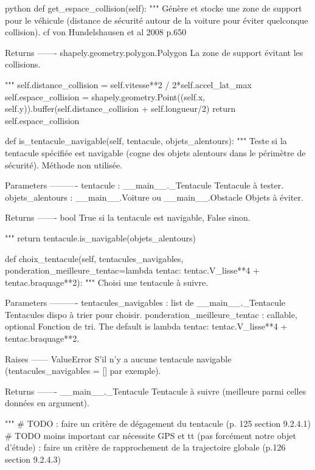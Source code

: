 \begin{mintedbox}{python}
    def get_espace_collision(self):
        """
        Génère et stocke une zone de support pour le véhicule (distance de sécurité autour de la voiture pour éviter quelconque collision).
        cf von Hundelshausen et al 2008 p.650

        Returns
        -------
        shapely.geometry.polygon.Polygon
            La zone de support évitant les collisions.

        """
        self.distance_collision = self.vitesse**2 / 2*self.accel_lat_max
        self.espace_collision = shapely.geometry.Point((self.x, self.y)).buffer(self.distance_collision + self.longueur/2)
        return self.espace_collision

    def is_tentacule_navigable(self, tentacule, objets_alentours):
        """
        Teste si la tentacule spécifiée est navigable (cogne des objets alentours dans le périmètre de sécurité). Méthode non utilisée.

        Parameters
        ----------
        tentacule : __main__._Tentacule
            Tentacule à tester.
        objets_alentours : __main__.Voiture ou __main__.Obstacle
            Objets à éviter.

        Returns
        -------
        bool
            True si la tentacule est navigable, False sinon.

        """
        return tentacule.is_navigable(objets_alentours)

    def choix_tentacule(self, tentacules_navigables, ponderation_meilleure_tentac=lambda tentac: tentac.V_lisse**4 + tentac.braquage**2):
        """
        Choisi une tentacule à suivre.

        Parameters
        ----------
        tentacules_navigables : list de __main__._Tentacule
            Tentacules dispo à trier pour choisir.
        ponderation_meilleure_tentac : callable, optional
            Fonction de tri. The default is lambda tentac: tentac.V_lisse**4 + tentac.braquage**2.

        Raises
        ------
        ValueError
            S'il n'y a aucune tentacule navigable (tentacules_navigables = [] par exemple).

        Returns
        -------
        __main__._Tentacule
            Tentacule à suivre (meilleure parmi celles données en argument).

        """
        # TODO : faire un critère de dégagement du tentacule (p. 125 section 9.2.4.1)
        # TODO moins important car nécessite GPS et tt (pas forcément notre objet d'étude) : faire un critère de rapprochement de la trajectoire globale (p.126 section 9.2.4.3)


\end{mintedbox}
